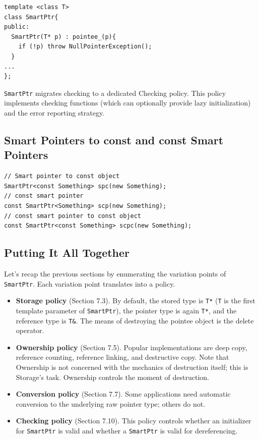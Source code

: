 \begin{verbatim}
template <class T>
class SmartPtr{
public:
  SmartPtr(T* p) : pointee_(p){
    if (!p) throw NullPointerException();
  }
...
};
\end{verbatim}

 \texttt{SmartPtr} migrates checking to a dedicated Checking
 policy. This policy implements checking functions (which can
 optionally provide lazy initialization) and the error reporting
 strategy.

 \subsection{Smart Pointers to const and const Smart Pointers}

\begin{verbatim}
// Smart pointer to const object
SmartPtr<const Something> spc(new Something);
// const smart pointer
const SmartPtr<Something> scp(new Something);
// const smart pointer to const object
const SmartPtr<const Something> scpc(new Something);
\end{verbatim}

 \subsection{Putting It All Together}

Let's recap the previous sections by enumerating the variation points
of \texttt{SmartPtr}. Each variation point translates into a policy.
\begin{itemize}
\item \textbf{Storage policy} (Section 7.3). By default, the stored
  type is \texttt{T*} (\texttt{T} is the first template parameter of
  \texttt{SmartPtr}), the pointer type is again \texttt{T*}, and the
  reference type is \texttt{T\&}. The means of destroying the pointee
  object is the delete operator.
\item \textbf{Ownership policy} (Section 7.5). Popular implementations
  are deep copy, reference counting, reference linking, and
  destructive copy. Note that Ownership is not concerned with the
  mechanics of destruction itself; this is Storage's task. Ownership
  controls the moment of destruction. 
\item \textbf{Conversion policy} (Section 7.7). Some applications need
  automatic conversion to the underlying raw pointer type; others do
  not.
\item \textbf{Checking policy} (Section 7.10). This policy controls
  whether an initializer for \texttt{SmartPtr} is valid and whether a
  \texttt{SmartPtr} is valid for dereferencing.
\end{itemize}
